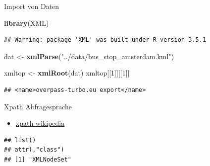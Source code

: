 \documentclass[ignorenonframetext,]{beamer}
\newenvironment{Shaded}{\begin{snugshade}}{\end{snugshade}}
\newcommand{\KeywordTok}[1]{\textcolor[rgb]{0.13,0.29,0.53}{\textbf{#1}}}
\newcommand{\DecValTok}[1]{\textcolor[rgb]{0.00,0.00,0.81}{#1}}
\newcommand{\StringTok}[1]{\textcolor[rgb]{0.31,0.60,0.02}{#1}}
\newcommand{\NormalTok}[1]{#1}
\providecommand{\tightlist}{%
  \setlength{\itemsep}{0pt}\setlength{\parskip}{0pt}}
\begin{document}
\begin{frame}[fragile]{Import von Daten}

\begin{Shaded}
\begin{Highlighting}[]
\KeywordTok{library}\NormalTok{(XML)}
\end{Highlighting}
\end{Shaded}

\begin{verbatim}
## Warning: package 'XML' was built under R version 3.5.1
\end{verbatim}

\begin{Shaded}
\begin{Highlighting}[]
\NormalTok{dat <-}\StringTok{ }\KeywordTok{xmlParse}\NormalTok{(}\StringTok{"../data/bus_stop_amsterdam.kml"}\NormalTok{)}
\end{Highlighting}
\end{Shaded}

\begin{Shaded}
\begin{Highlighting}[]
\NormalTok{xmltop <-}\StringTok{ }\KeywordTok{xmlRoot}\NormalTok{(dat)}
\NormalTok{xmltop[[}\DecValTok{1}\NormalTok{]][[}\DecValTok{1}\NormalTok{]]}
\end{Highlighting}
\end{Shaded}

\begin{verbatim}
## <name>overpass-turbo.eu export</name>
\end{verbatim}

\end{frame}

\begin{frame}[fragile]{Xpath Abfragesprache}

\begin{itemize}
\tightlist
\item
  \href{https://de.wikipedia.org/wiki/XPath}{xpath wikipedia}
\end{itemize}

\begin{verbatim}
## list()
## attr(,"class")
## [1] "XMLNodeSet"
\end{verbatim}

\end{frame}
\end{document}
